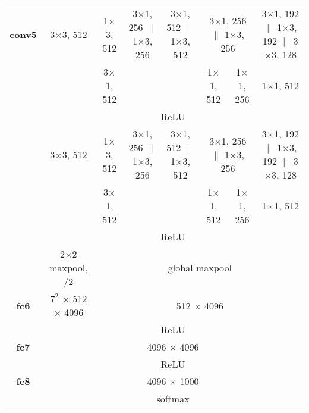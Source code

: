 \documentclass[thesis]{subfiles}
\begin{document}
{\begin{landscape}
{\begin{table*}[p]
\begin{tabular}{@{}|c||c|c|c|c|c|c|c|c|@{}}
    \textbf{conv5} & \multicolumn{2}{c|}{3$\times$3, 512} & 1$\times$3, 512 & 3$\times$1, 256 $\|$ 1$\times$3, 256 & 3$\times$1, 512 $\|$ 1$\times$3, 512 & \multicolumn{2}{c|}{3$\times$1, 256 $\|$ 1$\times$3, 256} & 3$\times$1, 192 $\|$ 1$\times$3, 192 $\|$ 3$\times$3, 128\\
    \cline{4-4} \cline{7-9}
    & \multicolumn{2}{c|}{} & 3$\times$1, 512 & & & 1$\times$1, 512 & 1$\times$1, 256 & 1$\times$1, 512\\
    \cline{2-9}
	& \multicolumn{8}{c|}{ReLU}\\
    \cline{2-9}
	& \multicolumn{2}{c|}{3$\times$3, 512} & 1$\times$3, 512 & 3$\times$1, 256 $\|$ 1$\times$3, 256 & 3$\times$1, 512 $\|$ 1$\times$3, 512 & \multicolumn{2}{c|}{3$\times$1, 256 $\|$ 1$\times$3, 256} & 3$\times$1, 192 $\|$ 1$\times$3, 192 $\|$ 3$\times$3, 128\\
	\cline{4-4} \cline{7-9}
    & \multicolumn{2}{c|}{} & 3$\times$1, 512 & & & 1$\times$1, 512 & 1$\times$1, 256 & 1$\times$1, 512\\
    \cline{2-9}
	& \multicolumn{8}{c|}{ReLU}\\
    \cline{2-9}
	& 2$\times$2 maxpool, /2 & \multicolumn{7}{c|}{global maxpool}\\
	\hline
	\textbf{fc6} & $7^2$ $\times$ 512 $\times$ 4096 & \multicolumn{7}{c|}{512 $\times$ 4096}\\
    \cline{2-9}
	& \multicolumn{8}{c|}{ReLU}\\
    \hline
	\textbf{fc7} & \multicolumn{8}{c|}{4096 $\times$ 4096}\\
    \cline{2-9}
	& \multicolumn{8}{c|}{ReLU}\\
    \hline
	\textbf{fc8} & \multicolumn{8}{c|}{4096 $\times$ 1000}\\
    \cline{2-9}
	& \multicolumn{8}{c|}{softmax}\\
    \hline
\end{tabular}
\label{table:vggarch}
\end{table*}
}
\end{landscape}
}
\end{document}
